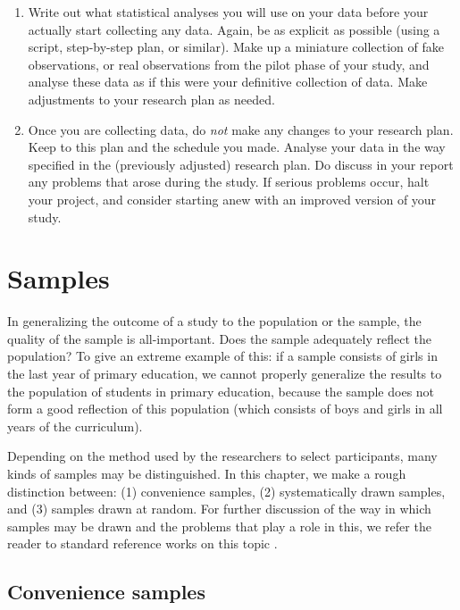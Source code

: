 \documentclass[
]{book}
\begin{document}
\begin{enumerate}
\item
  Write out what statistical analyses you will use on your data before your actually start collecting any data. Again, be as explicit as possible (using a script, step-by-step plan, or similar). Make up a miniature collection of fake observations, or real observations from the pilot phase of your study, and analyse these data as if this were your definitive collection of data. Make adjustments to your research plan as needed.
\item
  Once you are collecting data, do \emph{not} make any changes to your research plan. Keep to this plan and the schedule you made. Analyse your data in the way specified in the (previously adjusted) research plan. Do discuss in your report any problems that arose during the study. If serious problems occur, halt your project, and consider starting anew with an improved version of your study.
\end{enumerate}

\hypertarget{ch:samples}{%
\chapter{Samples}\label{ch:samples}}

In generalizing the outcome of a study to the population or the sample, the quality of the sample is all-important. Does the sample adequately reflect the population? To give an extreme example of this: if a sample consists of girls in the last year of primary education, we cannot properly generalize the results to the population of students in primary education, because the sample does not form a good reflection of this population (which consists of boys and girls in all years of the curriculum).

Depending on the method used by the researchers to select participants, many kinds of samples may be distinguished. In this chapter, we make a rough distinction between: (1) convenience samples, (2) systematically drawn samples, and (3) samples drawn at random. For further discussion of the way in which samples may be drawn and the problems that play a role in this, we refer the reader to standard reference works on this topic \citep{Coch77, Thom12}.

\hypertarget{sec:convenience-samples}{%
\section{Convenience samples}\label{sec:convenience-samples}}
\end{document}
